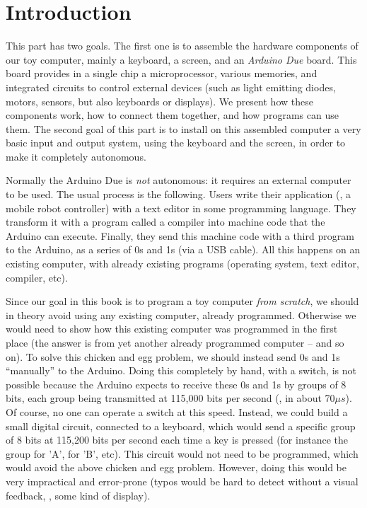 
\chapter*{Introduction}

This part has two goals. The first one is to assemble the hardware components
of our toy computer, mainly a keyboard, a screen, and an {\em Arduino Due}
board. This board provides in a single chip a microprocessor, various memories,
and integrated circuits to control external devices (such as light emitting
diodes, motors, sensors, but also keyboards or displays). We present how these
components work, how to connect them together, and how programs can use them.
The second goal of this part is to install on this assembled computer a very
basic input and output system, using the keyboard and the screen, in order to
make it completely autonomous.

Normally the Arduino Due is {\em not} autonomous: it requires an external
computer to be used. The usual process is the following. Users write their
application (\eg, a mobile robot controller) with a text editor in some
programming language. They transform it with a program called a compiler into
machine code that the Arduino can execute. Finally, they send this machine code
with a third program to the Arduino, as a series of 0s and 1s (via a USB
cable). All this happens on an existing computer, with already existing
programs (operating system, text editor, compiler, etc).

Since our goal in this book is to program a toy computer {\em from scratch}, we
should in theory avoid using any existing computer, already programmed.
Otherwise we would need to show how this existing computer was programmed in
the first place (the answer is from yet another already programmed computer --
and so on). To solve this chicken and egg problem, we should instead send 0s
and 1s ``manually'' to the Arduino. Doing this completely by hand, with a
switch, is not possible because the Arduino expects to receive these 0s and 1s
by groups of 8 bits, each group being transmitted at 115,000 bits per second
(\ie, in about 70$\mu s$). Of course, no one can operate a switch at this
speed. Instead, we could build a small digital circuit, connected to a
keyboard, which would send a specific group of 8 bits at 115,200 bits per
second each time a key is pressed (for instance the group  for
'A',  for 'B', etc). This circuit would not need to be
programmed, which would avoid the above chicken and egg problem. However, doing
this would be very impractical and error-prone (typos would be hard to detect
without a visual feedback, \ie, some kind of display).

